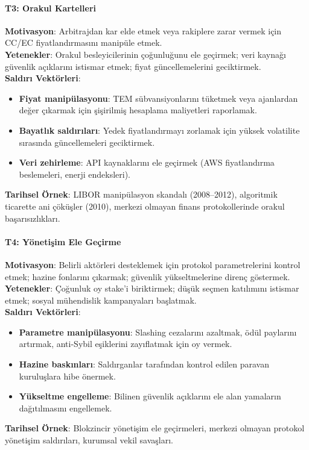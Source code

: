 \documentclass[11pt]{article}
\begin{document}
\begin{itemize}[noitemsep]
\begin{itemize}[noitemsep]
\begin{itemize}[noitemsep]
\begin{itemize}[noitemsep]
\begin{itemize}[noitemsep]
\begin{itemize}[noitemsep]
\begin{itemize}[noitemsep]
\begin{enumerate}[noitemsep]
\begin{itemize}[noitemsep]
\paragraph{T3: Orakul Kartelleri}
\textbf{Motivasyon}: Arbitrajdan kar elde etmek veya rakiplere zarar vermek için CC/EC fiyatlandırmasını manipüle etmek.\\
\textbf{Yetenekler}: Orakul besleyicilerinin çoğunluğunu ele geçirmek; veri kaynağı güvenlik açıklarını istismar etmek; fiyat güncellemelerini geciktirmek.\\
\textbf{Saldırı Vektörleri}:
\begin{itemize}[noitemsep]
  \item \textbf{Fiyat manipülasyonu}: TEM sübvansiyonlarını tüketmek veya ajanlardan değer çıkarmak için şişirilmiş hesaplama maliyetleri raporlamak.
  \item \textbf{Bayatlık saldırıları}: Yedek fiyatlandırmayı zorlamak için yüksek volatilite sırasında güncellemeleri geciktirmek.
  \item \textbf{Veri zehirleme}: API kaynaklarını ele geçirmek (AWS fiyatlandırma beslemeleri, enerji endeksleri).
\end{itemize}
\textbf{Tarihsel Örnek}: LIBOR manipülasyon skandalı (2008--2012), algoritmik ticarette ani çöküşler (2010), merkezi olmayan finans protokollerinde orakul başarısızlıkları.

\paragraph{T4: Yönetişim Ele Geçirme}
\textbf{Motivasyon}: Belirli aktörleri desteklemek için protokol parametrelerini kontrol etmek; hazine fonlarını çıkarmak; güvenlik yükseltmelerine direnç göstermek.\\
\textbf{Yetenekler}: Çoğunluk oy stake'i biriktirmek; düşük seçmen katılımını istismar etmek; sosyal mühendislik kampanyaları başlatmak.\\
\textbf{Saldırı Vektörleri}:
\begin{itemize}[noitemsep]
  \item \textbf{Parametre manipülasyonu}: Slashing cezalarını azaltmak, ödül paylarını artırmak, anti-Sybil eşiklerini zayıflatmak için oy vermek.
  \item \textbf{Hazine baskınları}: Saldırganlar tarafından kontrol edilen paravan kuruluşlara hibe önermek.
  \item \textbf{Yükseltme engelleme}: Bilinen güvenlik açıklarını ele alan yamaların dağıtılmasını engellemek.
\end{itemize}
\textbf{Tarihsel Örnek}: Blokzincir yönetişim ele geçirmeleri, merkezi olmayan protokol yönetişim saldırıları, kurumsal vekil savaşları.


\end{itemize}
\end{enumerate}
\end{itemize}
\end{itemize}
\end{itemize}
\end{itemize}
\end{itemize}
\end{itemize}
\end{itemize}
\end{document}
